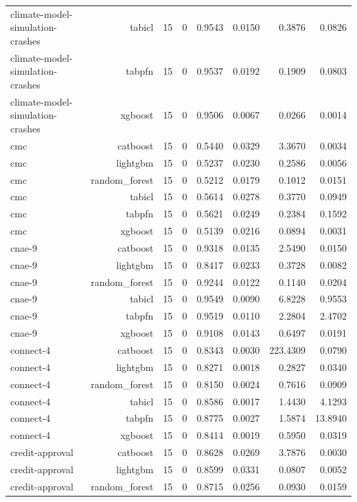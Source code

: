 \begin{table}[htbp]
\begin{tabular}{lrrrrrrr}
climate-model-simulation-crashes & tabicl & 15 & 0 & 0.9543 & 0.0150 & 0.3876 & 0.0826 \\
climate-model-simulation-crashes & tabpfn & 15 & 0 & 0.9537 & 0.0192 & 0.1909 & 0.0803 \\
climate-model-simulation-crashes & xgboost & 15 & 0 & 0.9506 & 0.0067 & 0.0266 & 0.0014 \\
cmc & catboost & 15 & 0 & 0.5440 & 0.0329 & 3.3670 & 0.0034 \\
cmc & lightgbm & 15 & 0 & 0.5237 & 0.0230 & 0.2586 & 0.0056 \\
cmc & random\_forest & 15 & 0 & 0.5212 & 0.0179 & 0.1012 & 0.0151 \\
cmc & tabicl & 15 & 0 & 0.5614 & 0.0278 & 0.3770 & 0.0949 \\
cmc & tabpfn & 15 & 0 & 0.5621 & 0.0249 & 0.2384 & 0.1592 \\
cmc & xgboost & 15 & 0 & 0.5139 & 0.0216 & 0.0894 & 0.0031 \\
cnae-9 & catboost & 15 & 0 & 0.9318 & 0.0135 & 2.5490 & 0.0150 \\
cnae-9 & lightgbm & 15 & 0 & 0.8417 & 0.0233 & 0.3728 & 0.0082 \\
cnae-9 & random\_forest & 15 & 0 & 0.9244 & 0.0122 & 0.1140 & 0.0204 \\
cnae-9 & tabicl & 15 & 0 & 0.9549 & 0.0090 & 6.8228 & 0.9553 \\
cnae-9 & tabpfn & 15 & 0 & 0.9519 & 0.0110 & 2.2804 & 2.4702 \\
cnae-9 & xgboost & 15 & 0 & 0.9108 & 0.0143 & 0.6497 & 0.0191 \\
connect-4 & catboost & 15 & 0 & 0.8343 & 0.0030 & 223.4309 & 0.0790 \\
connect-4 & lightgbm & 15 & 0 & 0.8271 & 0.0018 & 0.2827 & 0.0340 \\
connect-4 & random\_forest & 15 & 0 & 0.8150 & 0.0024 & 0.7616 & 0.0909 \\
connect-4 & tabicl & 15 & 0 & 0.8586 & 0.0017 & 1.4430 & 4.1293 \\
connect-4 & tabpfn & 15 & 0 & 0.8775 & 0.0027 & 1.5874 & 13.8940 \\
connect-4 & xgboost & 15 & 0 & 0.8414 & 0.0019 & 0.5950 & 0.0319 \\
credit-approval & catboost & 15 & 0 & 0.8628 & 0.0269 & 3.7876 & 0.0030 \\
credit-approval & lightgbm & 15 & 0 & 0.8599 & 0.0331 & 0.0807 & 0.0052 \\
credit-approval & random\_forest & 15 & 0 & 0.8715 & 0.0256 & 0.0930 & 0.0159 \\

\end{tabular}
\end{table}
